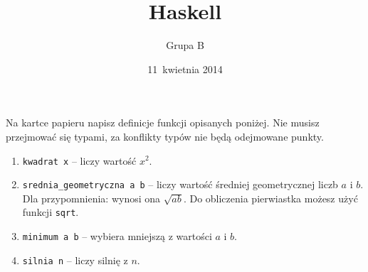 \documentclass[12pt,a4paper]{article}
\title{Haskell}
\author{Grupa B}
\date{11~kwietnia 2014}
\begin{document}
\maketitle

Na kartce papieru napisz definicje funkcji opisanych poniżej. Nie musisz
przejmować się typami, za konflikty typów nie będą odejmowane punkty.

\begin{enumerate}
  \item {
    \texttt{kwadrat x} -- liczy wartość $x^2$.
  }

  \item {
    \texttt{srednia\_geometryczna a b} -- liczy wartość średniej geometrycznej 
    liczb $a$ i $b$. Dla przypomnienia: wynosi ona $\sqrt{ab}$. Do obliczenia 
    pierwiastka możesz użyć funkcji \texttt{sqrt}.
  }

  \item {
    \texttt{minimum a b} -- wybiera mniejszą z wartości $a$ i $b$.
  }

  \item {
    \texttt{silnia n} -- liczy silnię z $n$.
  }
\end{enumerate}
\end{document}
